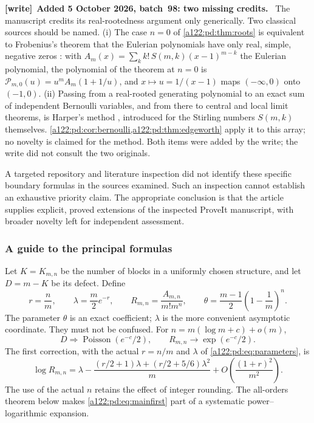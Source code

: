 \documentclass[11pt,letterpaper]{article}
\newenvironment{writenote}[1][]{\par\smallskip\begingroup\small
 \noindent\textbf{[write]}\if\relax\detokenize{#1}\relax\else~\textbf{#1.}\fi\ }%
 {\par\endgroup\smallskip}
\numberwithin{equation}{subsection}
\theoremstyle{definition}
\theoremstyle{remark}
\theoremstyle{plain}
\newcommand{\Poi}{\operatorname{Poisson}}
\newcommand{\cP}{\mathcal P}
\begin{document}
\begin{writenote}[Added 5 October 2026, batch~98: two missing credits]
The manuscript credits its real-rootedness argument only generically.
Two classical sources should be named. (i) The case $n=0$ of
\cref{a122:pd:thm:roots} is equivalent to Frobenius's theorem that the
Eulerian polynomials have only real, simple, negative zeros
\cite{a122:pd:frobenius}: with
$A_m(x)=\sum_k k!\,S(m,k)(x-1)^{m-k}$ the Eulerian polynomial, the
polynomial of the theorem at $n=0$ is
$\cP_{m,0}(u)=u^mA_m(1+1/u)$, and $x\mapsto u=1/(x-1)$ maps $(-\infty,0)$
onto $(-1,0)$. (ii) Passing from a real-rooted generating polynomial to
an exact sum of independent Bernoulli variables, and from there to
central and local limit theorems, is Harper's method
\cite{a122:pd:harper}, introduced for the Stirling numbers $S(m,k)$
themselves. \cref{a122:pd:cor:bernoulli,a122:pd:thm:edgeworth} apply it to
this array; no novelty is claimed for the method. Both items were added
by the write; the write did not consult the two originals.
\end{writenote}

A targeted repository and literature inspection did not identify these
specific boundary formulas in the sources examined. Such an inspection
cannot establish an exhaustive priority claim. The appropriate conclusion
is that the article supplies explicit, proved extensions of the inspected
ProveIt manuscript, with broader novelty left for independent assessment.

\subsubsection{A guide to the principal formulas}
Let $K=K_{m,n}$ be the number of blocks in a uniformly chosen structure,
and let $D=m-K$ be its defect. Define
\begin{equation}\label{a122:pd:eq:parameters}
 r=\frac nm,\qquad \lambda=\frac m2e^{-r},\qquad
 R_{m,n}=\frac{A_{m,n}}{m!m^n},\qquad
 \theta=\frac{m-1}{2}\left(1-\frac1m\right)^n.
\end{equation}
The parameter $\theta$ is an exact coefficient; $\lambda$ is the more
convenient asymptotic coordinate. They must not be confused.
For $n=m(\log m+c)+o(m)$,
\begin{equation}\label{a122:pd:eq:mainlimit}
 D\Longrightarrow\Poi(e^{-c}/2),\qquad
 R_{m,n}\longrightarrow\exp(e^{-c}/2).
\end{equation}
The first correction, with the actual $r=n/m$ and $\lambda$ of
\eqref{a122:pd:eq:parameters}, is
\begin{equation}\label{a122:pd:eq:mainfirst}
 \log R_{m,n}=\lambda-
 \frac{(r/2+1)\lambda+(r/2+5/6)\lambda^2}{m}
 +O\!\left(\frac{(1+r)^2}{m^2}\right).
\end{equation}
The use of the actual $n$ retains the effect of integer rounding.
The all-orders theorem below makes \eqref{a122:pd:eq:mainfirst} part of a
systematic power--logarithmic expansion.
\end{document}
